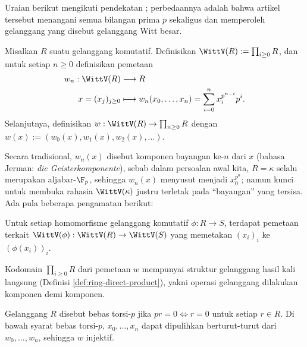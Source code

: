 Uraian berikut mengikuti pendekatan \cite[\S 1]{Hess15}; perbedaannya adalah bahwa artikel tersebut menangani semua bilangan prima $p$ sekaligus dan memperoleh gelanggang yang disebut gelanggang Witt besar.

\begin{definition}
	Misalkan $R$ suatu gelanggang komutatif. Definisikan $\WittV(R) := \prod_{i \geq 0} R$, dan untuk setiap $n \geq 0$ definisikan pemetaan
	\begin{align*}
		w_n: \WittV(R) & \longrightarrow R \\
		x = (x_j)_{j \geq 0} & \longmapsto w_n(x_0, \ldots, x_n) = \sum_{i=0}^n x_i^{p^{n-i}} p^i.
	\end{align*}
	Selanjutnya, definisikan $w: \WittV(R) \to \prod_{n \geq 0} R$ dengan $w(x) := (w_0(x), w_1(x), w_2(x), \ldots)$.
\end{definition}
Secara tradisional, $w_n(x)$ disebut komponen bayangan ke-$n$ dari $x$ (bahasa Jerman: \textit{die Geisterkomponente}), sebab dalam persoalan awal kita, $R=\kappa$ selalu merupakan aljabar-$\F_p$, sehingga $w_n(x)$ menyusut menjadi $x_0^{p^n}$; namun kunci untuk membuka rahasia $\WittV(\kappa)$ justru terletak pada ``bayangan'' yang tersisa. Ada pula beberapa pengamatan berikut:
\begin{compactitem}
	\item Untuk setiap homomorfisme gelanggang komutatif $\phi: R \to S$, terdapat pemetaan terkait $\WittV(\phi): \WittV(R) \to \WittV(S)$ yang memetakan $(x_i)_i$ ke $(\phi(x_i))_i$.
	\item Kodomain $\prod_{i \geq 0} R$ dari pemetaan $w$ mempunyai struktur gelanggang hasil kali langsung (Definisi \ref{def:ring-direct-product}), yakni operasi gelanggang dilakukan komponen demi komponen.
	\item Gelanggang $R$ disebut bebas torsi-$p$ jika $pr =0 \iff r=0$ untuk setiap $r \in R$. Di bawah syarat bebas torsi-$p$, $x_0, \ldots, x_n$ dapat dipulihkan berturut-turut dari $w_0, \ldots, w_n$, sehingga $w$ injektif. 
\end{compactitem}

